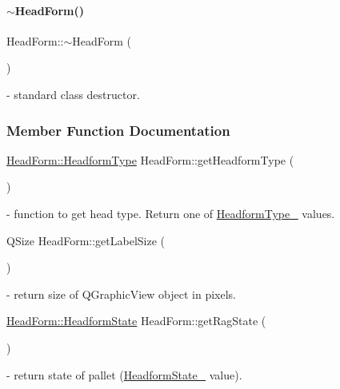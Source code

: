\mbox{\label{classHeadForm_ac4a0350cd62ed18740505fe61ba75d80}} 
\paragraph{\texorpdfstring{$\sim$\+Head\+Form()}{~HeadForm()}}
{\footnotesize\ttfamily Head\+Form\+::$\sim$\+Head\+Form (\begin{DoxyParamCaption}{ }\end{DoxyParamCaption})} - standard class destructor.



\subsubsection{Member Function Documentation}
\mbox{\label{classHeadForm_a8e521c0edb67751bebcc8f82e9176a16}} 
{\footnotesize\ttfamily \mbox{\hyperlink{classHeadForm_a15bfe98cd74c9677947211a02313f7d1}{Head\+Form\+::\+Headform\+Type}} Head\+Form\+::\texorpdfstring{get\+Headform\+Type}{getHeadformType} (\begin{DoxyParamCaption}{ }\end{DoxyParamCaption})} - function to get head type. Return one of \hyperlink{classHeadForm_ae17d4f6887245f37b3f7c002dd226dd0}{Headform\+Type\+\_\+} values.

\mbox{\label{classHeadForm_a138f7ab8bf3996a036e587b0ea7f4237}} 
{\footnotesize\ttfamily Q\+Size Head\+Form\+::\texorpdfstring{get\+Label\+Size}{getLabelSize} (\begin{DoxyParamCaption}{ }\end{DoxyParamCaption})} - return size of Q\+Graphic\+View object in pixels.

\mbox{\label{classHeadForm_a35de102780fe0011543c31d62f8bd72e}} 
{\footnotesize\ttfamily \mbox{\hyperlink{classHeadForm_ae7f8ba0c9db5a5140ac4e3417dc1d9b2}{Head\+Form\+::\+Headform\+State}} Head\+Form\+::\texorpdfstring{get\+Rag\+State}{getRagState} (\begin{DoxyParamCaption}{ }\end{DoxyParamCaption})} - return state of pallet (\hyperlink{classHeadForm_ad43012a40fdd353f422cc70c37dd61f8}{Headform\+State\+\_\+} value). 

